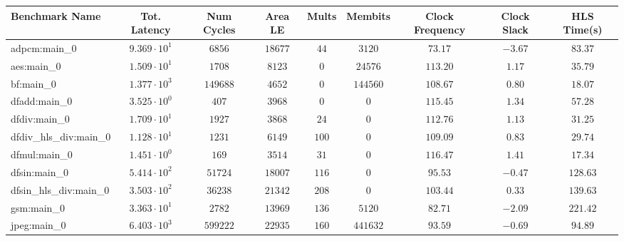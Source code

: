 \begin{tabular}{|l|c|c|c|c|c|c|c|c|}
\hline
Benchmark Name          & Tot. Latency           & Num Cycles & Area LE    & Mults   & Membits    & Clock Frequency & Clock Slack & HLS Time(s) \\
\hline
adpcm:main\_0           & $ 9.369 \cdot 10^{1} $ & $ 6856   $ & $ 18677  $ & $ 44  $ & $ 3120   $ & $ 73.17       $ & $ -3.67   $ & $ 83.37   $ \\
aes:main\_0             & $ 1.509 \cdot 10^{1} $ & $ 1708   $ & $ 8123   $ & $ 0   $ & $ 24576  $ & $ 113.20      $ & $ 1.17    $ & $ 35.79   $ \\
bf:main\_0              & $ 1.377 \cdot 10^{3} $ & $ 149688 $ & $ 4652   $ & $ 0   $ & $ 144560 $ & $ 108.67      $ & $ 0.80    $ & $ 18.07   $ \\
dfadd:main\_0           & $ 3.525 \cdot 10^{0} $ & $ 407    $ & $ 3968   $ & $ 0   $ & $ 0      $ & $ 115.45      $ & $ 1.34    $ & $ 57.28   $ \\
dfdiv:main\_0           & $ 1.709 \cdot 10^{1} $ & $ 1927   $ & $ 3868   $ & $ 24  $ & $ 0      $ & $ 112.76      $ & $ 1.13    $ & $ 31.25   $ \\
dfdiv\_hls\_div:main\_0 & $ 1.128 \cdot 10^{1} $ & $ 1231   $ & $ 6149   $ & $ 100 $ & $ 0      $ & $ 109.09      $ & $ 0.83    $ & $ 29.74   $ \\
dfmul:main\_0           & $ 1.451 \cdot 10^{0} $ & $ 169    $ & $ 3514   $ & $ 31  $ & $ 0      $ & $ 116.47      $ & $ 1.41    $ & $ 17.34   $ \\
dfsin:main\_0           & $ 5.414 \cdot 10^{2} $ & $ 51724  $ & $ 18007  $ & $ 116 $ & $ 0      $ & $ 95.53       $ & $ -0.47   $ & $ 128.63  $ \\
dfsin\_hls\_div:main\_0 & $ 3.503 \cdot 10^{2} $ & $ 36238  $ & $ 21342  $ & $ 208 $ & $ 0      $ & $ 103.44      $ & $ 0.33    $ & $ 139.63  $ \\
gsm:main\_0             & $ 3.363 \cdot 10^{1} $ & $ 2782   $ & $ 13969  $ & $ 136 $ & $ 5120   $ & $ 82.71       $ & $ -2.09   $ & $ 221.42  $ \\
jpeg:main\_0            & $ 6.403 \cdot 10^{3} $ & $ 599222 $ & $ 22935  $ & $ 160 $ & $ 441632 $ & $ 93.59       $ & $ -0.69   $ & $ 94.89   $ \\

\end{tabular}
